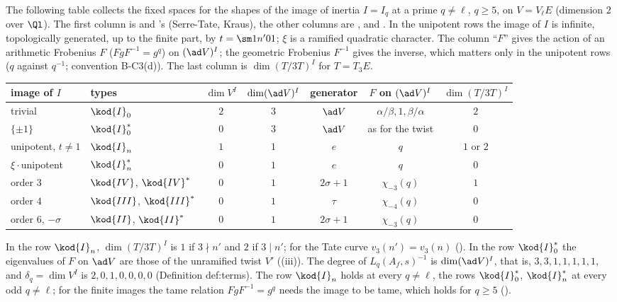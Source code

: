 The following table collects the fixed spaces for the shapes of the image of inertia $I=I_q$ at a prime $q\ne\ell$, $q\ge5$, on $V=V_\ell E$
(dimension $2$ over $\Ql$). The first column is  and 's (Serre-Tate, Kraus), the other columns are
,  and . In the unipotent rows the image of $I$ is
infinite, topologically generated, up to the finite part, by $t=\sm1{n'}01$; $\xi$ is a ramified quadratic character. The column ``$F$''
gives the action of an arithmetic Frobenius $F$ ($FgF^{-1}=g^q$) on $(\ad V)^I$; the geometric Frobenius $F^{-1}$ gives the inverse, which matters
only in the unipotent rows ($q$ against $q^{-1}$; convention B-C3(d)). The last column is $\dim(T/3T)^I$ for $T=T_3E$.
\begin{center}
\small
\begin{tabular}{llccccc}
\toprule
image of $I$ & types & $\dim V^I$ & $\dim(\ad V)^I$ & generator & $F$ on $(\ad V)^I$ & $\dim(T/3T)^I$\\
\midrule
trivial & $\kod{I}_0$ & $2$ & $3$ & $\ad V$ & $\alpha/\beta,1,\beta/\alpha$ & $2$\\
$\{\pm1\}$ & $\kod{I}_0^*$ & $0$ & $3$ & $\ad V$ & as for the twist & $0$\\
unipotent, $t\ne1$ & $\kod{I}_n$ & $1$ & $1$ & $e$ & $q$ & $1$ or $2$\\
$\xi\cdot$unipotent & $\kod{I}_n^*$ & $0$ & $1$ & $e$ & $q$ & $0$\\
order $3$ & $\kod{IV}$, $\kod{IV}^*$ & $0$ & $1$ & $2\sigma+1$ & $\chi_{-3}(q)$ & $1$\\
order $4$ & $\kod{III}$, $\kod{III}^*$ & $0$ & $1$ & $\tau$ & $\chi_{-4}(q)$ & $0$\\
order $6$, $-\sigma$ & $\kod{II}$, $\kod{II}^*$ & $0$ & $1$ & $2\sigma+1$ & $\chi_{-3}(q)$ & $0$\\
\bottomrule
\end{tabular}
\end{center}
In the row $\kod{I}_n$, $\dim(T/3T)^I$ is $1$ if $3\nmid n'$ and $2$ if $3\mid n'$; for the Tate curve $v_3(n')=v_3(n)$ (). In the row $\kod{I}_0^*$ the
eigenvalues of $F$ on $\ad V$ are those of the unramified twist $V'$ ((iii)). The degree of $L_q(A_f,s)^{-1}$ is $\dim(\ad V)^I$, that is,
$3,3,1,1,1,1,1$, and $\delta_q=\dim V^I$ is $2,0,1,0,0,0,0$ (Definition def:terms). The row $\kod{I}_n$ holds at every $q\ne\ell$, the rows $\kod{I}_0^*$, $\kod{I}_n^*$ at every
odd $q\ne\ell$; for the finite images the tame relation $FgF^{-1}=g^q$ needs the image to be tame, which holds for $q\ge5$ ().

